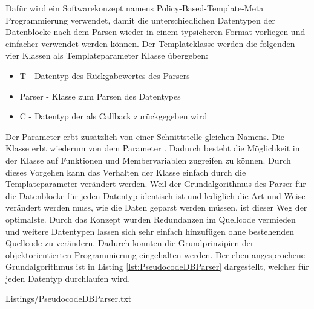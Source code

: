 Daf{\"u}r wird ein Softwarekonzept namens Policy-Based-Template-Meta Programmierung
verwendet, damit die unterschiedlichen Datentypen der Datenbl{\"o}cke nach dem Parsen wieder in einem typsicheren Format vorliegen und
einfacher verwendet werden k{\"o}nnen.
Der Templateklasse werden die folgenden vier Klassen als Templateparameter
Klasse {\"u}bergeben:

\begin{itemize}
\item T - Datentyp des R{\"u}ckgabewertes des Parsers
\item Parser - Klasse zum Parsen des Datentypes
\item C - Datentyp der als Callback zur{\"u}ckgegeben wird
\end{itemize}

Der Parameter  erbt zus{\"a}tzlich von einer
Schnittstelle gleichen Namens. Die Klasse  erbt
wiederum von dem Parameter .
Dadurch besteht die M{\"o}glichkeit in der Klasse auf Funktionen und
Membervariablen zugreifen zu k{\"o}nnen.
Durch dieses Vorgehen kann das Verhalten der Klasse einfach durch die
Templateparameter ver{\"a}ndert werden. Weil der Grundalgorithmus des Parser f{\"u}r
die Datenbl{\"o}cke f{\"u}r jeden Datentyp identisch ist und lediglich die Art und
Weise ver{\"a}ndert werden muss, wie die Daten geparst werden m{\"u}ssen,
ist dieser Weg der optimalste. Durch das Konzept wurden
Redundanzen im Quellcode vermieden und weitere Datentypen lassen sich
sehr einfach hinzuf{\"u}gen ohne bestehenden Quellcode zu ver{\"a}ndern. Dadurch konnten
die Grundprinzipien der objektorientierten Programmierung  eingehalten werden.
Der eben angesprochene Grundalgorithmus ist in Listing 
\ref{lst:PseudocodeDBParser} dargestellt, welcher f{\"u}r jeden Datentyp
durchlaufen wird.

\lstset{language=pseudo}
\lstset{commentstyle=\textit}
{Listings/PseudocodeDBParser.txt}
